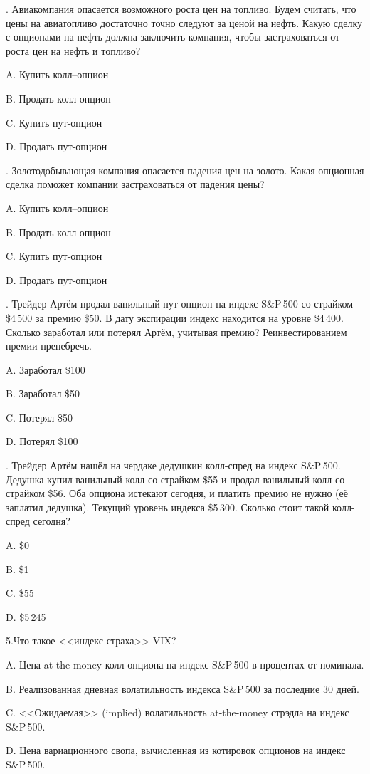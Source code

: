 \documentclass[a4paper,12pt]{extarticle}
\begin{document}
\thispagestyle{empty}

. Авиакомпания опасается возможного роста цен на топливо. Будем считать, что цены на авиатопливо достаточно точно следуют за ценой на нефть. Какую сделку с опционами на нефть должна заключить компания, чтобы застраховаться от роста цен на нефть и топливо?

A. Купить колл--опцион

B. Продать колл-опцион

C. Купить пут-опцион

D. Продать пут-опцион

\vspace{0.5cm}

. Золотодобывающая компания опасается падения цен на золото. Какая опционная сделка поможет компании застраховаться от падения цены?

A. Купить колл--опцион

B. Продать колл-опцион

C. Купить пут-опцион

D. Продать пут-опцион

\vspace{0.5cm}

. Трейдер Артём продал ванильный пут-опцион на индекс S\&P\,500 со страйком \$4\,500 за премию \$50. В дату экспирации индекс находится на уровне \$4\,400. Сколько заработал или потерял Артём, учитывая премию? Реинвестированием премии пренебречь.

A. Заработал \$100

B. Заработал \$50

C. Потерял \$50

D. Потерял \$100

\vspace{0.5cm}

. Трейдер Артём нашёл на чердаке дедушкин колл-спред на индекс S\&P\,500. Дедушка купил ванильный колл со страйком \$55 и продал ванильный колл со страйком \$56. Оба опциона истекают сегодня, и платить премию не нужно (её заплатил дедушка). Текущий уровень индекса \$5\,300. Сколько стоит такой колл-спред сегодня?

A. \$0

B. \$1

C. \$55

D. \$5\,245

\vspace{0.5cm}

\noindent 5.Что такое <<индекс страха>> VIX?

A. Цена at-the-money колл-опциона на индекс S\&P\,500 в процентах от номинала.

B. Реализованная дневная волатильность индекса S\&P\,500 за последние 30 дней.

C. <<Ожидаемая>> (implied) волатильность at-the-money стрэдла на индекс S\&P\,500.

D. Цена вариационного свопа, вычисленная из котировок опционов на индекс S\&P\,500.
\end{document}
